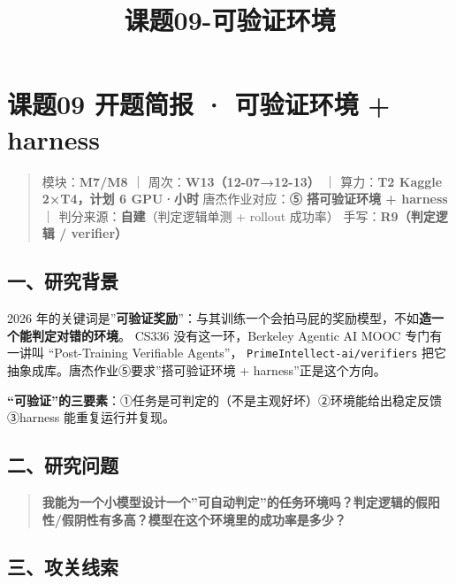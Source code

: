 \documentclass[
  chinese,
  11pt,
]{ctexart}
\title{课题09-可验证环境}
\author{}
\date{}
\begin{document}
\maketitle

{
\setcounter{tocdepth}{2}
\tableofcontents
}
\section{课题09 开题简报 · 可验证环境 + harness}\label{ux8bfeux989809-ux5f00ux9898ux7b80ux62a5-ux53efux9a8cux8bc1ux73afux5883-harness}

\begin{quote}
模块：\textbf{M7/M8} ｜ 周次：\textbf{W13（12-07→12-13）} ｜ 算力：\textbf{T2 Kaggle 2×T4，计划 6 GPU·小时} 唐杰作业对应：\textbf{⑤ 搭可验证环境 + harness} ｜ 判分来源：\textbf{自建}（判定逻辑单测 + rollout 成功率） 手写：\textbf{R9（判定逻辑 / verifier）}
\end{quote}

\subsection{一、研究背景}\label{ux4e00ux7814ux7a76ux80ccux666f}

2026 年的关键词是''\textbf{可验证奖励}''：与其训练一个会拍马屁的奖励模型，不如\textbf{造一个能判定对错的环境}。 CS336 没有这一环，Berkeley Agentic AI MOOC 专门有一讲叫 ``Post-Training Verifiable Agents''， \texttt{PrimeIntellect-ai/verifiers} 把它抽象成库。唐杰作业⑤要求''搭可验证环境 + harness''正是这个方向。

\textbf{``可验证''的三要素}：①任务是可判定的（不是主观好坏）②环境能给出稳定反馈 ③harness 能重复运行并复现。

\subsection{二、研究问题}\label{ux4e8cux7814ux7a76ux95eeux9898}

\begin{quote}
\textbf{我能为一个小模型设计一个''可自动判定''的任务环境吗？判定逻辑的假阳性/假阴性有多高？模型在这个环境里的成功率是多少？}
\end{quote}

\subsection{三、攻关线索}\label{ux4e09ux653bux5173ux7ebfux7d22}
\end{document}
